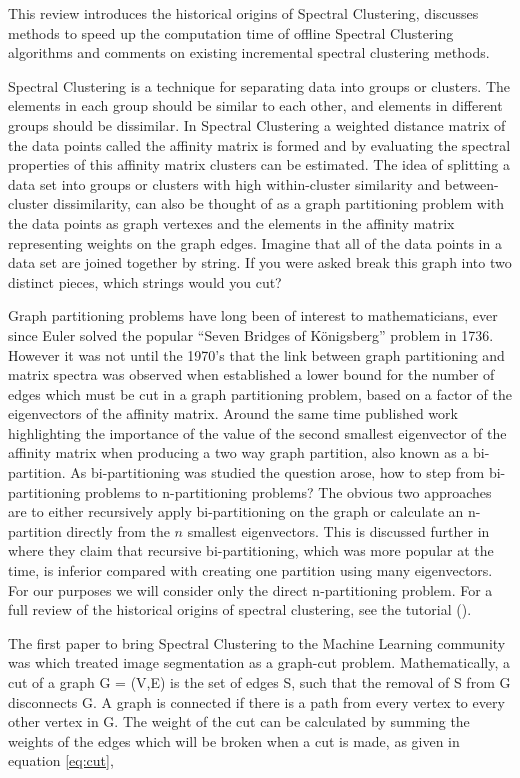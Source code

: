 This review introduces the historical origins of Spectral Clustering, discusses methods to speed up the computation time of offline Spectral Clustering algorithms and comments on existing  incremental spectral clustering methods. 

Spectral Clustering is a technique for separating data into groups or clusters. The elements in each group should be similar to each other, and elements in different groups should be dissimilar.  In Spectral Clustering a weighted distance matrix of the data points called the affinity matrix is formed and by evaluating the spectral properties of this affinity matrix clusters can be estimated. The idea of splitting a data set into groups or clusters with high within-cluster similarity and between-cluster dissimilarity, can also be thought of as a graph partitioning problem with the data points as graph vertexes and the elements in the affinity matrix representing weights on the graph edges. Imagine that all of the data points in a data set are joined together by string. If you were asked break this graph into two distinct pieces, which strings would you cut? 

Graph partitioning problems have long been of interest to mathematicians, ever since Euler solved the popular ``Seven Bridges of K\"{o}nigsberg'' problem in 1736. However it was not until the 1970's that the link between graph partitioning and matrix spectra was observed when \cite{Donath1973} established a lower bound for the number of edges which must be cut in a graph partitioning problem, based on  a factor of the eigenvectors of the affinity matrix. Around the same time \cite{Fiedler1973} published work highlighting the importance of the value of the second smallest eigenvector of the affinity matrix when producing a two way graph partition, also known as a bi-partition. As bi-partitioning was studied the question arose, how to step from bi-partitioning problems to n-partitioning problems? The obvious two approaches are to either recursively apply bi-partitioning on the graph or calculate an n-partition directly from the $n$ smallest eigenvectors. This is discussed further in \cite{Alpert1995} where they claim that recursive bi-partitioning, which was more popular at the time, is inferior compared with creating one partition using many eigenvectors. For our purposes we will consider only the direct n-partitioning problem.  For a full review of the historical origins of spectral clustering, see the tutorial (\cite{Luxburg2008}).

The first paper to bring Spectral Clustering to the Machine Learning community was \cite{Malik2000} which treated image segmentation as a graph-cut problem. Mathematically, a cut of a graph G = (V,E) is the set of edges S, such that the removal of S from G disconnects G. A graph is connected if there is a path from every vertex to every other vertex in G. The weight of the cut can be calculated by summing the weights of the edges which will be broken when a cut is made, as given in equation \eqref{eq:cut},


